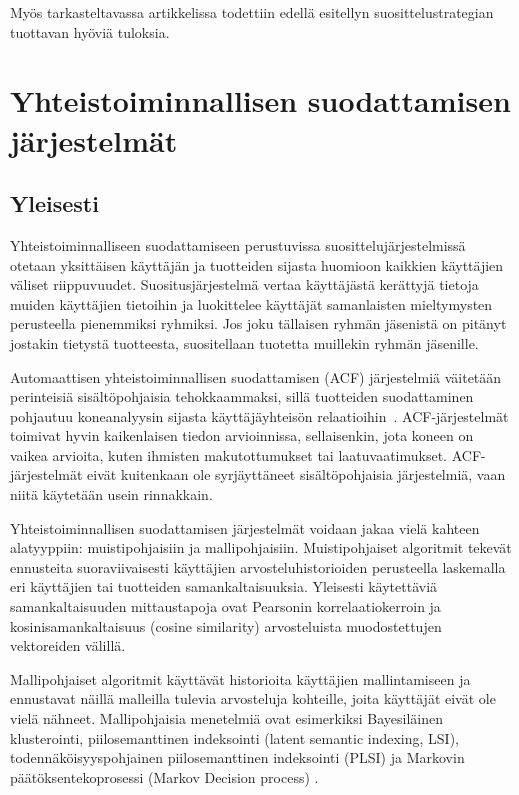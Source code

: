 \documentclass[12pt,finnish]{tktltiki2}
\theoremstyle{definition}
\theoremstyle{remark}
\begin{document}
Myös tarkasteltavassa artikkelissa todettiin edellä esitellyn suosittelustrategian tuottavan hyöviä tuloksia. \cite{Sigurbjornsson:2008:FTR:1367497.1367542}


\section{Yhteistoiminnallisen suodattamisen järjestelmät}
\subsection{Yleisesti}
        Yhteistoiminnalliseen suodattamiseen perustuvissa suosittelujärjestelmissä otetaan yksittäisen käyttäjän ja tuotteiden sijasta huomioon kaikkien käyttäjien väliset riippuvuudet. Suositusjärjestelmä vertaa käyttäjästä kerättyjä tietoja muiden käyttäjien tietoihin ja luokittelee käyttäjät samanlaisten mieltymysten perusteella pienemmiksi ryhmiksi. Jos joku tällaisen ryhmän jäsenistä on pitänyt jostakin tietystä tuotteesta, suositellaan tuotetta muillekin ryhmän jäsenille.
        
         Automaattisen yhteistoiminnallisen suodattamisen (ACF) järjestelmiä väitetään perinteisiä sisältöpohjaisia tehokkaammaksi, sillä tuotteiden suodattaminen pohjautuu koneanalyysin sijasta käyttäjäyhteisön relaatioihin~\cite{Herlocker:2000:ECF:358916.358995}. ACF-järjestelmät toimivat hyvin kaikenlaisen tiedon arvioinnissa, sellaisenkin, jota koneen on vaikea arvioita, kuten ihmisten makutottumukset tai laatuvaatimukset. ACF-järjestelmät eivät kuitenkaan ole syrjäyttäneet sisältöpohjaisia järjestelmiä, vaan niitä käytetään usein rinnakkain.
         
         Yhteistoiminnallisen suodattamisen järjestelmät voidaan jakaa vielä kahteen alatyyppiin: muistipohjaisiin ja mallipohjaisiin. Muistipohjaiset algoritmit tekevät ennusteita suoraviivaisesti käyttäjien arvosteluhistorioiden perusteella laskemalla eri käyttäjien tai tuotteiden samankaltaisuuksia. Yleisesti käytettäviä samankaltaisuuden mittaustapoja ovat Pearsonin korrelaatiokerroin ja kosinisamankaltaisuus (cosine similarity) arvosteluista muodostettujen vektoreiden välillä.
         
Mallipohjaiset algoritmit käyttävät historioita käyttäjien mallintamiseen ja ennustavat näillä malleilla tulevia arvosteluja kohteille, joita käyttäjät eivät ole vielä nähneet. Mallipohjaisia menetelmiä ovat esimerkiksi Bayesiläinen klusterointi, piilosemanttinen indeksointi (latent semantic indexing, LSI), todennäköisyyspohjainen piilosemanttinen indeksointi (PLSI) ja Markovin päätöksentekoprosessi (Markov Decision process) \cite{Das:2007:GNP:1242572.1242610}.
        
\end{document}
